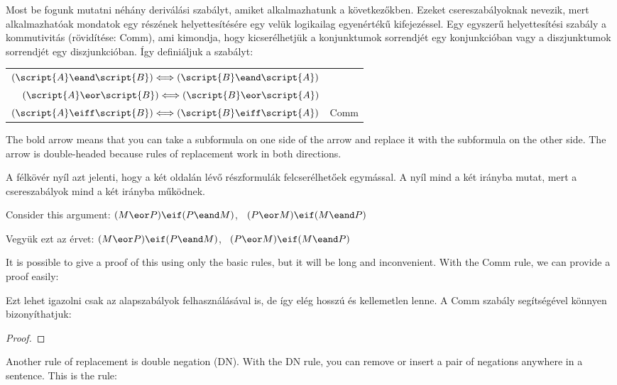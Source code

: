 Most be fogunk mutatni néhány deriválási szabályt, amiket alkalmazhatunk a következőkben. Ezeket csereszabályoknak nevezik, mert alkalmazhatóak mondatok egy részének helyettesítésére egy velük logikailag egyenértékű kifejezéssel. Egy egyszerű helyettesítési szabály a kommutivitás (rövidítése: Comm), ami kimondja, hogy kicserélhetjük a konjunktumok sorrendjét egy konjunkcióban vagy a diszjunktumok sorrendjét egy diszjunkcióban.  Így definiáljuk a szabályt:

\begin{center}
\begin{tabular}{rl}
$(\script{A}\eand\script{B}) \Longleftrightarrow (\script{B}\eand\script{A})$\\
$(\script{A}\eor\script{B}) \Longleftrightarrow (\script{B}\eor\script{A})$\\
$(\script{A}\eiff\script{B}) \Longleftrightarrow (\script{B}\eiff\script{A})$
& Comm
\end{tabular}
\end{center}

The bold arrow means that you can take a subformula on one side of the arrow and replace it with the subformula on the other side. The arrow is double-headed because rules of replacement work in both directions.

A félkövér nyíl azt jelenti, hogy a két oldalán lévő részformulák felcserélhetőek egymással. A nyíl mind a két irányba mutat, mert a csereszabályok mind a két irányba működnek. 

Consider this argument: $(M \eor P) \eif (P \eand M)$, \therefore\ $(P \eor M) \eif (M \eand P)$

Vegyük ezt az érvet: $(M \eor P) \eif (P \eand M)$, \therefore\ $(P \eor M) \eif (M \eand P)$

It is possible to give a proof of this using only the basic rules, but it will be long and inconvenient. With the Comm rule, we can provide a proof easily:

Ezt lehet igazolni csak az alapszabályok felhasználásával is, de így elég hosszú és kellemetlen lenne. A Comm szabály segítségével könnyen bizonyíthatjuk: 

\begin{proof}
\end{proof}

Another rule of replacement is double negation (DN). With the DN rule, you can remove or insert a pair of negations anywhere in a sentence. This is the rule:

